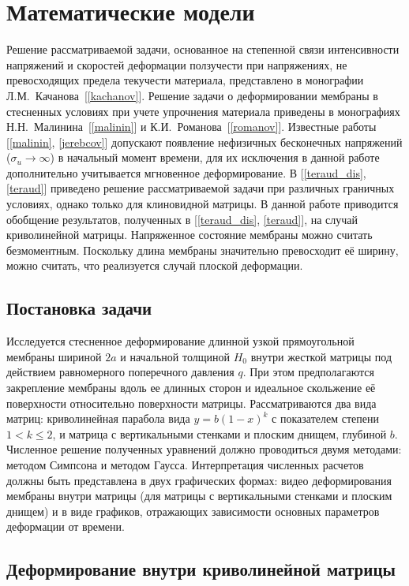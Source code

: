 \chapter{Математические модели}
\setcounter{figure}{1}
Решение рассматриваемой задачи, основанное на степенной связи интенсивности напряжений и скоростей деформации ползучести при напряжениях, не превосходящих предела текучести материала, представлено в монографии Л.М.~Качанова~[\ref{kachanov}].
Решение задачи о деформировании мембраны в стесненных условиях при учете упрочнения материала приведены в монографиях Н.Н.~Малинина~[\ref{malinin}] и К.И.~Романова~[\ref{romanov}]. Известные работы [\ref{malinin}, \ref{jerebcov}] допускают появление нефизичных бесконечных напряжений ($\sigma_u \to \infty$) в начальный момент времени, для их исключения в данной работе дополнительно учитывается мгновенное деформирование.
В [\ref{teraud_dis}, \ref{teraud}] приведено решение рассматриваемой задачи при различных граничных условиях, однако только для клиновидной матрицы. В данной работе приводится обобщение результатов, полученных в [\ref{teraud_dis}, \ref{teraud}], на случай криволинейной матрицы. Напряженное состояние мембраны можно считать безмоментным. Поскольку длина мембраны значительно превосходит её ширину, можно считать, что реализуется случай плоской деформации.

\section{Постановка задачи}
Исследуется стесненное деформирование длинной узкой прямоугольной мембраны шириной $2a$ и начальной толщиной $H_0$ внутри жесткой матрицы под 
действием равномерного поперечного давления $q$. При этом предполагаются закрепление мембраны вдоль ее длинных сторон и идеальное скольжение 
её поверхности относительно поверхности матрицы.
Рассматриваются два вида матриц: криволинейная парабола вида $y = b(1-x)^k$ с показателем степени $1<k \leqslant 2$, и матрица с вертикальными 
стенками и плоским днищем, глубиной $b$.
\medskip
Численное решение полученных уравнений должно проводиться двумя методами: методом Симпсона и методом Гаусса. Интерпретация численных расчетов должны быть представлена в двух графических формах: видео деформирования мембраны внутри матрицы (для матрицы с вертикальными стенками и плоским днищем) и в виде графиков, отражающих зависимости основных параметров деформации от времени.

\section{Деформирование внутри криволинейной матрицы \label{section_1_1}}

